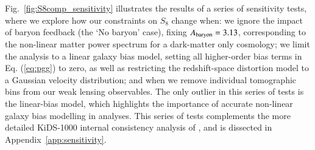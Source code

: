 Fig.~\ref{fig:S8comp_sensitivity} illustrates the results of a series of sensitivity tests, where we explore how our \tttp constraints on $S_8$ change when: 
we ignore the impact of baryon feedback (the `No baryon' case), fixing $A_{\rm baryon}=3.13$, corresponding to the non-linear matter power spectrum for a dark-matter only cosmology; 
we limit the analysis to a linear galaxy bias model, setting all higher-order bias terms in Eq. (\ref{eq:pgg}) to zero, as well as restricting the redshift-space distortion model to a Gaussian velocity distribution; 
and when we remove individual tomographic bins from our weak lensing observables. 
The only outlier in this series of tests is the linear-bias model, which highlights the importance of accurate non-linear galaxy bias modelling in \tttp analyses. 
This series of tests complements the more detailed KiDS-1000 internal consistency analysis of \citet{asgari/etal:inprep}, and is dissected in Appendix~\ref{app:sensitivity}.

